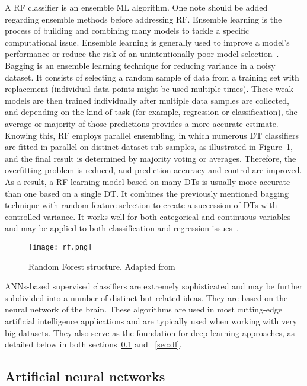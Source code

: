 A \gls{RF} classifier is an ensemble \gls{ML} algorithm. One note should be added regarding ensemble methods before addressing \gls{RF}. Ensemble learning is the process of building and combining many models to tackle a specific computational issue. Ensemble learning is generally used to improve a model's performance or reduce the risk of an unintentionally poor model selection~\cite{Mahesh2019MachineReview}. Bagging is an ensemble learning technique for reducing variance in a noisy dataset. It consists of selecting a random sample of data from a training set with replacement (individual data points might be used multiple times). These weak models are then trained individually after multiple data samples are collected, and depending on the kind of task (for example, regression or classification), the average or majority of those predictions provides a more accurate estimate. Knowing this, \gls{RF} employs parallel ensembling, in which numerous \gls{DT} classifiers are fitted in parallel on distinct dataset sub-samples, as illustrated in Figure~\ref{fig:random_forest2}, and the final result is determined by majority voting or averages. Therefore, the overfitting problem is reduced, and prediction accuracy and control are improved. As a result, a \gls{RF} learning model based on many \gls{DT}s is usually more accurate than one based on a single \gls{DT}. It combines the previously mentioned bagging technique with random feature selection to create a succession of \gls{DT}s with controlled variance. It works well for both categorical and continuous variables and may be applied to both classification and regression issues~\cite{Sarker2021MachineDirections}.

\begin{figure}[htbp]
    \centering
    \texttt{[image: rf.png]}
    \caption{Random Forest structure. Adapted from~\cite{Sarker2021MachineDirections}}
    \label{fig:random_forest2}
\end{figure}

\gls{ANN}s-based supervised classifiers are extremely sophisticated and may be further subdivided into a number of distinct but related ideas. They are based on the neural network of the brain. These algorithms are used in most cutting-edge artificial intelligence applications and are typically used when working with very big datasets. They also serve as the foundation for deep learning approaches, as detailed below in both sections~\ref{sec:ann} and ~\ref{sec:dl}.

\subsection{Artificial neural networks}\label{sec:ann}

